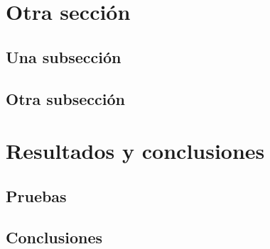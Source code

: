 \documentclass[a4paper, 12pt]{article}
\begin{document}
\section{Otra sección}
\label{sec-3}

\subsection{Una subsección}
\label{sec-3-1}

\subsection{Otra subsección}
\label{sec-3-2}

\section{Resultados y conclusiones}
\label{sec-4}

\subsection{Pruebas}
\label{sec-4-1}

\subsection{Conclusiones}
\label{sec-4-2}

\printbibliography[heading=bibnumbered] %
\end{document}
